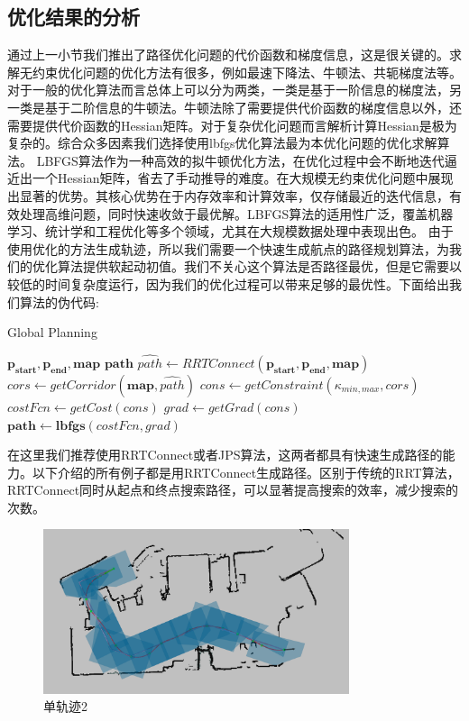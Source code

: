 \documentclass[master,academic]{ysuthesis} %
\begin{document}
		\subsection{优化结果的分析}
		通过上一小节我们推出了路径优化问题的代价函数和梯度信息，这是很关键的。求解无约束优化问题的优化方法有很多，例如最速下降法、牛顿法、共轭梯度法等。对于一般的优化算法而言总体上可以分为两类，一类是基于一阶信息的梯度法，另一类是基于二阶信息的牛顿法。牛顿法除了需要提供代价函数的梯度信息以外，还需要提供代价函数的Hessian矩阵。对于复杂优化问题而言解析计算Hessian是极为复杂的。综合众多因素我们选择使用lbfgs优化算法最为本优化问题的优化求解算法。
		LBFGS算法作为一种高效的拟牛顿优化方法，在优化过程中会不断地迭代逼近出一个Hessian矩阵，省去了手动推导的难度。在大规模无约束优化问题中展现出显著的优势。其核心优势在于内存效率和计算效率，仅存储最近的迭代信息，有效处理高维问题，同时快速收敛于最优解。LBFGS算法的适用性广泛，覆盖机器学习、统计学和工程优化等多个领域，尤其在大规模数据处理中表现出色。
		由于使用优化的方法生成轨迹，所以我们需要一个快速生成航点的路径规划算法，为我们的优化算法提供软起动初值。我们不关心这个算法是否路径最优，但是它需要以较低的时间复杂度运行，因为我们的优化过程可以带来足够的最优性。下面给出我们算法的伪代码:
		 \begin{algorithm}[H]  
		 	\caption{Global Planning}  
		 	\label{Planning}  
		 	\begin{algorithmic}[1]  
		 		\REQUIRE  
		 		$\mathbf{p_{start}},\mathbf{p_{end}},\mathbf{map}$
		 		\ENSURE  
		 		$\mathbf{path}$
		 		\STATE $\hat{path} \leftarrow RRTConnect(\mathbf{p_{start}},\mathbf{p_{end}},\mathbf{map})$
		 		\STATE $cors \leftarrow getCorridor(\mathbf{map},\hat{path})$
		 		\STATE $cons \leftarrow getConstraint(\kappa_{min,max},cors)$
		 		\STATE $costFcn \leftarrow getCost(cons)$
		 		\STATE $grad \leftarrow getGrad(cons)$ \\
		 		\RETURN $\mathbf{path} \leftarrow \mathbf{lbfgs}(costFcn,grad)$
		 	\end{algorithmic}  
		 \end{algorithm}
		 在这里我们推荐使用RRTConnect或者JPS算法，这两者都具有快速生成路径的能力。以下介绍的所有例子都是用RRTConnect生成路径。区别于传统的RRT算法，RRTConnect同时从起点和终点搜索路径，可以显著提高搜索的效率，减少搜索的次数。
		 \begin{figure}[!ht]
		 	\centering
		 	\includegraphics[width=0.8\textwidth]{单轨迹2.png}
		 	\caption{单轨迹2}
		 	\label{fig:单轨迹2}
		 \end{figure}
\end{document}
